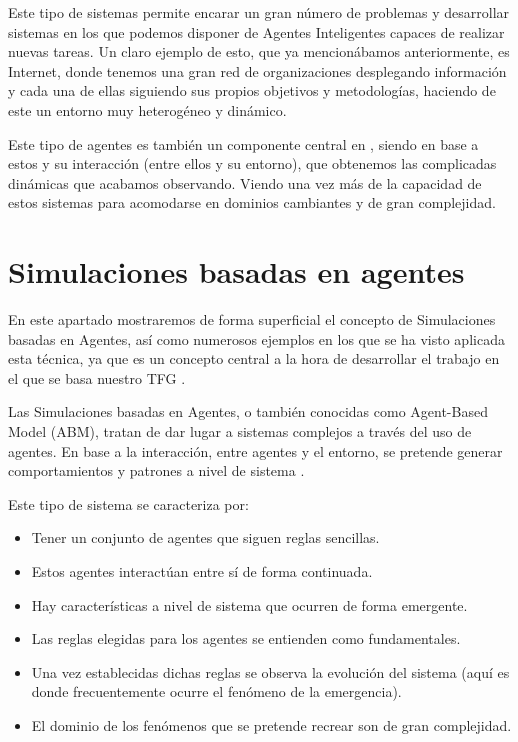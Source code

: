 Este tipo de sistemas permite encarar un gran número de problemas y desarrollar sistemas en los que podemos disponer de Agentes Inteligentes capaces de realizar nuevas tareas. Un claro ejemplo de esto, que ya mencionábamos anteriormente, es Internet, donde tenemos una gran red de organizaciones desplegando información y cada una de ellas siguiendo sus propios objetivos y metodologías, haciendo de este un entorno muy heterogéneo y dinámico.

Este tipo de agentes es también un componente central en \cite{park2023generative}, siendo en base a estos y su interacción (entre ellos y su entorno), que obtenemos las complicadas dinámicas que acabamos observando. Viendo una vez más de la capacidad de estos sistemas para acomodarse en dominios cambiantes y de gran complejidad.

\section{Simulaciones basadas en agentes}

En este apartado mostraremos de forma superficial el concepto de Simulaciones basadas en Agentes, así como numerosos ejemplos en los que se ha visto aplicada esta técnica, ya que es un concepto central a la hora de desarrollar el trabajo en el que se basa nuestro TFG \citep{park2023generative}.

Las Simulaciones basadas en Agentes, o también conocidas como Agent-Based Model (ABM), tratan de dar lugar a sistemas complejos a través del uso de agentes. En base a la interacción, entre agentes y el entorno, se pretende generar comportamientos y patrones a nivel de sistema \citep{bankes2002agent}.

Este tipo de sistema se caracteriza por:
\begin{itemize}
	\item Tener un conjunto de agentes que siguen reglas sencillas.
	\item Estos agentes interactúan entre sí de forma continuada.
	\item Hay características a nivel de sistema que ocurren de forma emergente.
	\item Las reglas elegidas para los agentes se entienden como fundamentales.
	\item Una vez establecidas dichas reglas se observa la evolución del sistema (aquí es donde frecuentemente ocurre el fenómeno de la emergencia).
	\item El dominio de los fenómenos que se pretende recrear son de gran complejidad.
\end{itemize}

